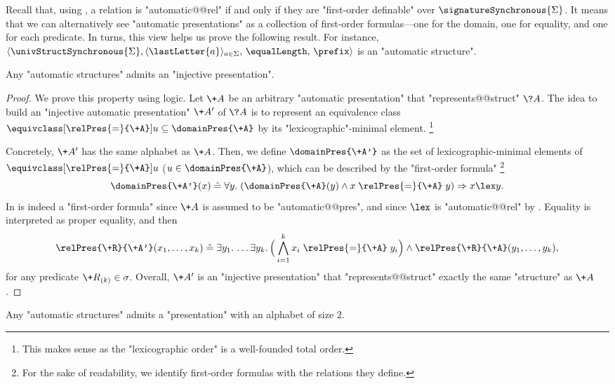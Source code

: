 Recall that, using , a relation is "automatic@@rel" 
if and only if they are "first-order definable" over $\signatureSynchronous{\Sigma}$.
It means that we can alternatively see "automatic presentations" as a
collection of first-order formulas---one for the domain, one for equality, and
one for each predicate. In turns, this view helps us prove the following result.
For instance, $\langle \univStructSynchronous{\Sigma}, \langle\lastLetter{a}\rangle_{a \in \Sigma},\, \equalLength,\, \prefix \rangle$ is an "automatic structure".


\begin{proposition}
	\AP\label{prop:making-presentations-injective}
	Any "automatic structures" admits an "injective presentation".
\end{proposition}

\begin{proof}
	We prove this property using logic. Let $\+A$ be an arbitrary "automatic presentation"
	that "represents@@struct" $\?A$. The idea to build an "injective automatic presentation" $\+A'$
	of $\?A$ is to represent an equivalence class $\equivclass[\relPres{=}{\+A}]{u} \subseteq
	\domainPres{\+A}$ by its "lexicographic"-minimal element.%
	\footnote{This makes sense as the "lexicographic order" is a well-founded total order.}

	Concretely, $\+A'$ has the same alphabet as $\+A$.
	Then, we define $\domainPres{\+A'}$ as the set of lexicographic-minimal elements of
	$\equivclass[\relPres{=}{\+A}]{u}$ ($u \in \domainPres{\+A}$),
	which can be described by the "first-order formula"%
	\footnote{For the sake of readability, we identify first-order formulas with the relations they define.}
	\[
		\domainPres{\+A'}(x) \defeq
		\forall y.\; (\domainPres{\+A}(y) \land x \mathrel{\relPres{=}{\+A}} y) \Rightarrow 
		x \lex y.
	\]
	In is indeed a "first-order formula" since $\+A$ is assumed to be "automatic@@pres",
	and since $\lex$ is "automatic@@rel" by .
	Equality is interpreted as proper equality,
	and then
	\[
		\relPres{\+R}{\+A'}(x_1,\hdots, x_k) \defeq
		\exists y_1.\,\hdots \exists y_k.\,
		\Big( \bigwedge_{i=1}^k x_i \mathrel{\relPres{=}{\+A}} y_i \Big)
		\land \relPres{\+R}{\+A}(y_1,\hdots, y_k),
	\]
	for any predicate $\+R_{(k)} \in \sigma$.
	Overall, $\+A'$ is an "injective presentation" that "represents@@struct" 
	exactly the same "structure" as $\+A$.
\end{proof}

\begin{proposition}
	\AP\label{prop:making-presentations-binary}
	Any "automatic structures" admits a "presentation" with an alphabet of size 2.
\end{proposition}

